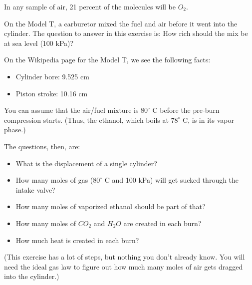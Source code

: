 In any sample of air, 21 percent of the molecules will be $O_2$.
\begin{Exercise}[title={Fuel Mix for the Model T}, label=fuelmix]

On the Model T, a carburetor mixed the fuel and air before it went into the cylinder.  The question to answer in this exercise is: How rich should the mix be at sea level (100 kPa)?

On the Wikipedia page for the Model T, we see the following facts:
\begin{itemize}
\item Cylinder bore: 9.525 cm
\item Piston stroke: 10.16 cm
\end{itemize}

You can assume that the air/fuel mixture is $80^\circ$ C before the pre-burn compression starts. (Thus, the ethanol, which boils at $78^\circ$ C, is in its vapor phase.)

The questions, then, are:

\begin{itemize}
\item What is the displacement of a single cylinder?
\item How many moles of gas ($80^\circ$ C and 100 kPa) will get sucked through the intake valve?
\item How many moles of vaporized ethanol should be part of that?
\item How many moles of $CO_2$ and $H_2O$ are created in each burn?
\item How much heat is created in each burn?
\end{itemize}

(This exercise has a lot of steps, but nothing you don't already know. You will need the ideal gas law to figure out how much many moles of air gets dragged into the cylinder.)

\end{Exercise}

